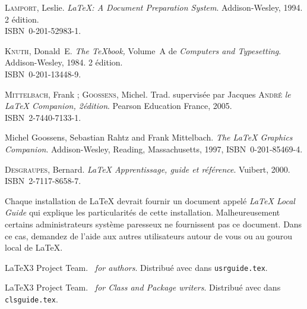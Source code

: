 

\begin{thebibliography}{99}
\thispagestyle{plain}

 \textsc{Lamport}, Leslie.  \newblock \emph{{\LaTeX:}
    A Document Preparation System}.  \newblock Addison-Wesley, 1994.
    2\ieme{} édition.\\ ISBN~0-201-52983-1.

 \textsc{Knuth}, Donald~E.  \newblock
    \textit{The \TeX{}book,} Volume~A de \textit{Computers and
    Typesetting}. Addison-Wesley, 1984.
    2\ieme{} édition.\\
    ISBN~0-201-13448-9.

 \textsc{Mittelbach}, Frank ; \textsc{Goossens},
  Michel. Trad. supervisée par Jacques \textsc{André}
  \newblock \emph{le {\LaTeX} Companion, 2\ieme édition}.  \newblock
  Pearson Education France, 2005.\\ ISBN~2-7440-7133-1.

 Michel Goossens, Sebastian Rahtz and Frank
  Mittelbach.  \newblock \emph{The {\LaTeX} Graphics Companion}.  \newblock
  Addison-Wesley, Reading, Massachusetts, 1997, ISBN~0-201-85469-4.

 \textsc{Desgraupes}, Bernard.
  \newblock \emph{{\LaTeX} Apprentissage, guide et référence}. \newblock
  Vuibert, 2000.\\
  ISBN~2-7117-8658-7.

 Chaque installation de \LaTeX{} devrait fournir un
  document appelé
  \emph{\LaTeX{} Local Guide} qui explique les particularités de
  cette installation. Malheureusement certains administrateurs système
  paresseux ne fournissent pas ce document. Dans ce cas, demandez de
  l'aide aux
  autres utilisateurs autour de vous ou au gourou local de \LaTeX{}.

 \LaTeX3 Project Team.  \newblock \emph{\LaTeXe~for
    authors}.  \newblock Distribué avec \LaTeXe{} dans
  \texttt{usrguide.tex}.

 \LaTeX3 Project Team.  \newblock \emph{\LaTeXe~for
    Class and Package writers}.  \newblock Distribué avec \LaTeXe{} dans
   \texttt{clsguide.tex}.


\end{thebibliography}
